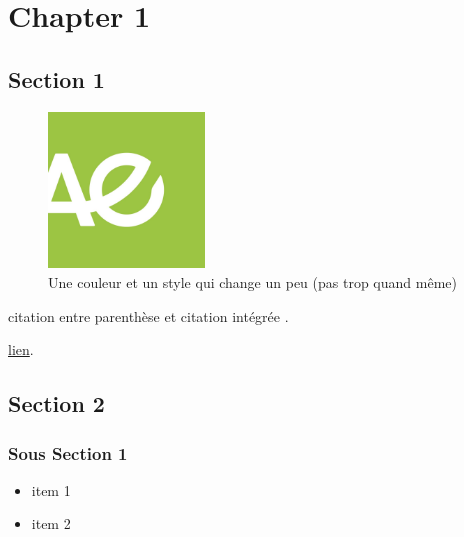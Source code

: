 \documentclass{config}
\begin{document}
\newpage 
{\hypersetup{linkcolor=LightCyan}\tableofcontents}
\newpage


\chapter{Chapter 1}
\section{Section 1}
\begin{figure}
    \centering
    \vspace{-4mm}
    \includegraphics[width=0.37\textwidth]{figures/figure1.jpg}
    \vspace{-1mm}
    \captionsetup{width=0.37\textwidth}
    \caption{Une couleur et un style qui change un peu (pas trop quand même)}
    \label{fig:figure1}
    \vspace{-15mm}
\end{figure}
\lipsum[1][1-4] citation entre parenthèse \citep{foote1856circumstances, doyle1992adventures} et citation intégrée \citet{template}.\par
\lipsum[1][5] \href{https://makaho.sk8.inrae.fr/}{lien}.


\section{Section 2}
\subsection{Sous Section 1}
\lipsum[2]

\begin{itemize}
\item item 1
\item item 2
\end{itemize}
\vspace{2mm}
\end{document}
